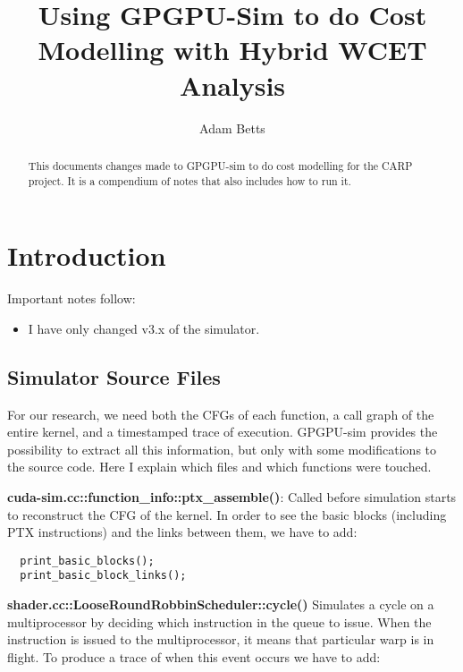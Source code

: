 \documentclass{article}
\begin{document}
\title{Using GPGPU-Sim to do Cost Modelling with Hybrid WCET Analysis}
\author{Adam Betts}

\maketitle

\newcommand{\gpusim}{GPGPU-sim }

\begin{abstract}
  This documents changes made to \gpusim to do cost modelling for the CARP project.
  It is a compendium of notes that also includes how to run it.
\end{abstract}

\section{Introduction}

Important notes follow:

\begin{itemize}
  \item I have only changed v3.x of the simulator.
\end{itemize}

\subsection{Simulator Source Files}

For our research, we need both the CFGs of each function, a call graph of the entire kernel,
and a timestamped trace of execution. \gpusim provides the possibility to extract all this
information, but only with some modifications to the source code. Here I explain which files
and which functions were touched. 

\textbf{cuda-sim.cc::function\_info::ptx\_assemble()}: Called before simulation starts to reconstruct 
the CFG of the kernel. In order to see the basic blocks (including PTX instructions) and the links
between them, we have to add:

\begin{lstlisting}
  print_basic_blocks();
  print_basic_block_links();
\end{lstlisting}

\textbf{shader.cc::LooseRoundRobbinScheduler::cycle()} Simulates a cycle on a multiprocessor by
deciding which instruction in the queue to issue. When the instruction is issued to the multiprocessor,
it means that particular warp is in flight. To produce a trace of when this event occurs we have to add:
\end{document}
